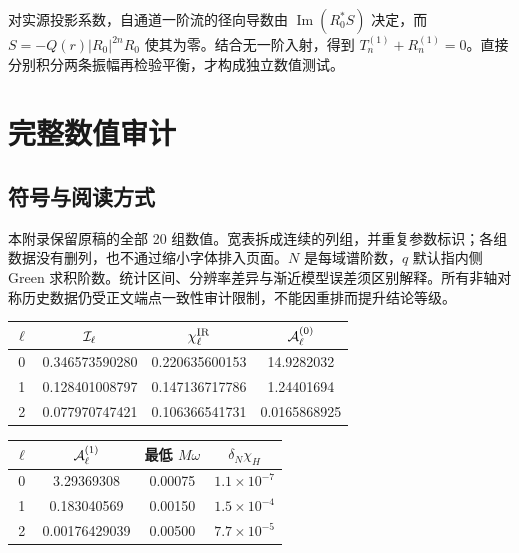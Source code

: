 \documentclass[UTF8,fontset=fandol,11pt,a4paper,oneside]{ctexart}
\numberwithin{equation}{section}
\newcommand{\Imm}{\operatorname{Im}}
\begin{document}
对实源投影系数，自通道一阶流的径向导数由 $\Imm(R_0^*S)$ 决定，而 $S=-Q(r)|R_0|^{2n}R_0$ 使其为零。结合无一阶入射，得到 $T_n^{(1)}+R_n^{(1)}=0$。直接分别积分两条振幅再检验平衡，才构成独立数值测试。

\section{完整数值审计}\label{sec:all-numerical-audits}
\subsection*{符号与阅读方式}
本附录保留原稿的全部 20 组数值。宽表拆成连续的列组，并重复参数标识；各组数据没有删列，也不通过缩小字体排入页面。$N$ 是每域谱阶数，$q$ 默认指内侧 Green 求积阶数。统计区间、分辨率差异与渐近模型误差须区别解释。所有非轴对称历史数据仍受正文端点一致性审计限制，不能因重排而提升结论等级。
\par\addvspace{14pt}
\noindent\begin{minipage}{\linewidth}
\captionsetup{type=table}\caption{轴对称红外解析系数与复视界振幅检验。}\label{audit:tab:axisymmetric-infrared}
\centering\fontsize{10}{13.5}\selectfont
\setlength{\tabcolsep}{6pt}\renewcommand{\arraystretch}{1.2}
\par{}\par\smallskip
\begin{tabular}{cccc}\toprule
$\ell$ & ${\cal I}_\ell$ & $\chi^{\rm IR}_\ell$ & ${\cal A}^{(0)}_\ell$\\\midrule
0 & 0.346573590280 & 0.220635600153 & 14.9282032\\
1 & 0.128401008797 & 0.147136717786 & 1.24401694\\
2 & 0.077970747421 & 0.106366541731 & 0.0165868925\\
\bottomrule\end{tabular}
\par\medskip
\par{}\par\smallskip
\begin{tabular}{cccc}\toprule
$\ell$ & ${\cal A}^{(1)}_\ell$ & 最低 $M\omega$ & $\delta_N\chi_H$\\\midrule
0 & 3.29369308 & 0.00075 & $1.1\times10^{-7}$\\
1 & 0.183040569 & 0.00150 & $1.5\times10^{-4}$\\
2 & 0.00176429039 & 0.00500 & $7.7\times10^{-5}$\\
\bottomrule\end{tabular}
\end{minipage}\par\addvspace{10pt}
\end{document}
